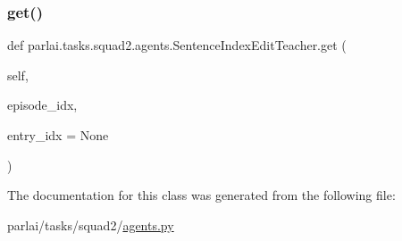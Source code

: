 \subsubsection{\texorpdfstring{get()}{get()}}
{\footnotesize\ttfamily def parlai.\+tasks.\+squad2.\+agents.\+Sentence\+Index\+Edit\+Teacher.\+get (\begin{DoxyParamCaption}\item[{}]{self,  }\item[{}]{episode\+\_\+idx,  }\item[{}]{entry\+\_\+idx = {\ttfamily None} }\end{DoxyParamCaption})}



The documentation for this class was generated from the following file\+:\begin{DoxyCompactItemize}
\item 
parlai/tasks/squad2/\hyperlink{parlai_2tasks_2squad2_2agents_8py}{agents.\+py}\end{DoxyCompactItemize}
